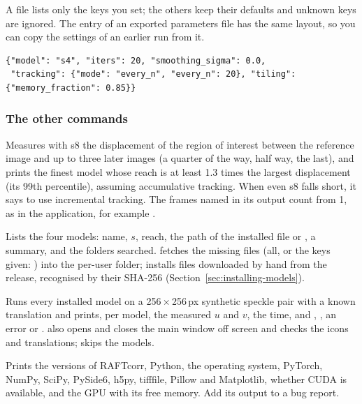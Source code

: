 A  file lists only the keys you set; the others keep their defaults and unknown keys
are ignored. The  entry of an exported parameters file has the same layout,
so you can copy the settings of an earlier run from it.

\begin{lstlisting}
{"model": "s4", "iters": 20, "smoothing_sigma": 0.0,
 "tracking": {"mode": "every_n", "every_n": 20}, "tiling": {"memory_fraction": 0.85}}
\end{lstlisting}

\subsubsection{The other commands}
\label{sec:cli-other}

\begin{description}[leftmargin=0.6cm,style=nextline]
  \item[\file{raftcorr suggest FOLDER [-{}-roi FILE] [-{}-device D]}]
    Measures with s8 the displacement of the region of interest between the reference image and
    up to three later images (a quarter of the way, half way, the last), and prints the finest
    model whose reach is at least 1.3 times the largest displacement (its 99th percentile),
    assuming accumulative tracking. When even s8 falls short, it says to use incremental tracking.
    The frames named in its output count from 1, as in the application, for example .
  \item[\file{raftcorr models [-{}-download [KEY …]] [-{}-import FILE …]}]
    Lists the four models: name, $s$, reach, the path of the installed file or
    , a summary, and the folders searched.  fetches
    the missing files (all, or the keys given: ) into the per-user folder;
     installs  files downloaded by hand from the 
    release, recognised by their SHA-256 (Section~\ref{sec:installing-models}).
  \item[\file{raftcorr selftest [-{}-device D] [-{}-gui] [-{}-no-models]}]
    Runs every installed model on a 256\,$\times$\,256\,px synthetic speckle pair with a known
    translation and prints, per model, the measured $u$ and $v$, the time, and ,
    , an error or .  also opens and closes the main
    window off screen and checks the icons and translations;  skips the models.
  \item[\file{raftcorr info}]
    Prints the versions of RAFTcorr, Python, the operating system, PyTorch, NumPy, SciPy, PySide6,
    h5py, tifffile, Pillow and Matplotlib, whether CUDA is available, and the GPU with its free
    memory. Add its output to a bug report.
\end{description}

